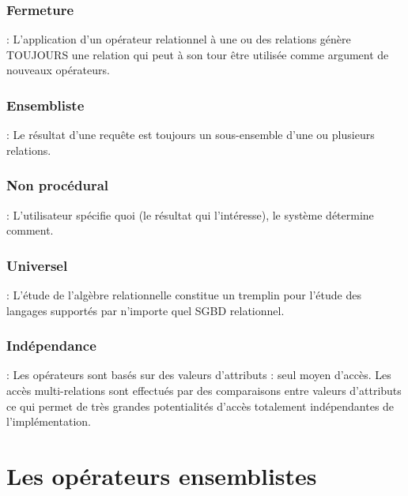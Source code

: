 \documentclass[10pt]{beamer}
\begin{document}
\subsubsection{Fermeture}
\begin{frame}{\subsecname : \subsubsecname}
    L’application d’un opérateur relationnel à une ou des relations génère TOUJOURS une relation qui peut à son tour être utilisée comme argument de nouveaux opérateurs.
\end{frame}

\subsubsection{Ensembliste}
\begin{frame}{\subsecname : \subsubsecname}
    Le résultat d’une requête est toujours un sous-ensemble d’une ou plusieurs relations.
\end{frame}

\subsubsection{Non procédural}
\begin{frame}{\subsecname : \subsubsecname}
    L’utilisateur spécifie quoi (le résultat qui l’intéresse), le système détermine comment.
\end{frame}

\subsubsection{Universel}
\begin{frame}{\subsecname : \subsubsecname}
    L’étude de l’algèbre relationnelle constitue un tremplin pour l’étude des langages supportés par n’importe quel SGBD relationnel.
\end{frame}

\subsubsection{Indépendance}
\begin{frame}{\subsecname : \subsubsecname}
    Les opérateurs sont basés sur des valeurs d’attributs : seul moyen d’accès.  Les accès multi-relations sont effectués par des comparaisons entre valeurs d’attributs ce qui permet de très grandes potentialités d’accès totalement indépendantes de l’implémentation.
\end{frame}

\section{Les opérateurs ensemblistes}
\end{document}
